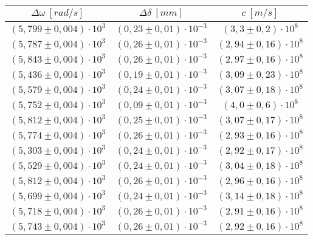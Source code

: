 \begin{table}[H]
    \centering
        \begin{tabular}{|c|c|c|}
        \hline
        $ \Delta\omega~[rad/s] $ & $ \Delta\delta~[mm] $ & $ c~[m/s] $\\
        \hline
        $ (5,799 \pm 0,004) \cdot 10^{3} $ & $ (0,23 \pm 0,01) \cdot 10^{-3} $ & $ (3,3 \pm 0,2) \cdot 10^{8} $\\
        \hline
        $ (5,787 \pm 0,004) \cdot 10^{3} $ & $ (0,26 \pm 0,01) \cdot 10^{-3} $ & $ (2,94 \pm 0,16) \cdot 10^{8} $\\
        \hline
        $ (5,843 \pm 0,004) \cdot 10^{3} $ & $ (0,26 \pm 0,01) \cdot 10^{-3} $ & $ (2,97 \pm 0,16) \cdot 10^{8} $\\
        \hline
        $ (5,436 \pm 0,004) \cdot 10^{3} $ & $ (0,19 \pm 0,01) \cdot 10^{-3} $ & $ (3,09 \pm 0,23) \cdot 10^{8} $\\
        \hline
        $ (5,579 \pm 0,004) \cdot 10^{3} $ & $ (0,24 \pm 0,01) \cdot 10^{-3} $ & $ (3,07 \pm 0,18) \cdot 10^{8} $\\
        \hline
        $ (5,752 \pm 0,004) \cdot 10^{3} $ & $ (0,09 \pm 0,01) \cdot 10^{-3} $ & $ (4,0 \pm 0,6) \cdot 10^{8} $\\
        \hline
        $ (5,812 \pm 0,004) \cdot 10^{3} $ & $ (0,25 \pm 0,01) \cdot 10^{-3} $ & $ (3,07 \pm 0,17) \cdot 10^{8} $\\
        \hline
        $ (5,774 \pm 0,004) \cdot 10^{3} $ & $ (0,26 \pm 0,01) \cdot 10^{-3} $ & $ (2,93 \pm 0,16) \cdot 10^{8} $\\
        \hline
        $ (5,303 \pm 0,004) \cdot 10^{3} $ & $ (0,24 \pm 0,01) \cdot 10^{-3} $ & $ (2,92 \pm 0,17) \cdot 10^{8} $\\
        \hline
        $ (5,529 \pm 0,004) \cdot 10^{3} $ & $ (0,24 \pm 0,01) \cdot 10^{-3} $ & $ (3,04 \pm 0,18) \cdot 10^{8} $\\
        \hline
        $ (5,812 \pm 0,004) \cdot 10^{3} $ & $ (0,26 \pm 0,01) \cdot 10^{-3} $ & $ (2,96 \pm 0,16) \cdot 10^{8} $\\
        \hline
        $ (5,699 \pm 0,004) \cdot 10^{3} $ & $ (0,24 \pm 0,01) \cdot 10^{-3} $ & $ (3,14 \pm 0,18) \cdot 10^{8} $\\
        \hline
        $ (5,718 \pm 0,004) \cdot 10^{3} $ & $ (0,26 \pm 0,01) \cdot 10^{-3} $ & $ (2,91 \pm 0,16) \cdot 10^{8} $\\
        \hline
        $ (5,743 \pm 0,004) \cdot 10^{3} $ & $ (0,26 \pm 0,01) \cdot 10^{-3} $ & $ (2,92 \pm 0,16) \cdot 10^{8} $\\

\end{tabular}
\end{table}

